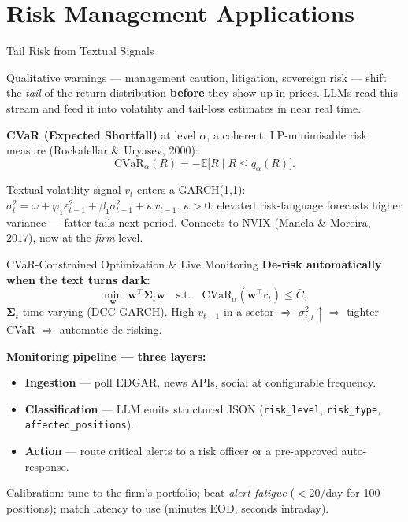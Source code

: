 \documentclass[9pt,t]{beamer}
\begin{document}
\section{Risk Management Applications}

\begin{frame}{Tail Risk from Textual Signals}
\begin{bigpicture}
Qualitative warnings --- management caution, litigation, sovereign risk --- shift the
\emph{tail} of the return distribution \textbf{before} they show up in prices. LLMs read
this stream and feed it into volatility and tail-loss estimates in near real time.
\end{bigpicture}

\textbf{CVaR (Expected Shortfall)} at level $\alpha$, a coherent, LP-minimisable
risk measure (Rockafellar \& Uryasev, 2000):
\[
\text{CVaR}_\alpha(R)=-\mathbb{E}\bigl[R\mid R\le q_\alpha(R)\bigr].
\]

\begin{underhood}
Textual volatility signal $v_t$ enters a GARCH(1,1):\quad
$\sigma_t^2=\omega+\varphi_1\varepsilon_{t-1}^2+\beta_1\sigma_{t-1}^2+\kappa\,v_{t-1}$.
$\kappa>0$: elevated risk-language forecasts higher variance --- fatter tails next period.
Connects to NVIX (Manela \& Moreira, 2017), now at the \emph{firm} level.
\end{underhood}
\end{frame}

\begin{frame}{CVaR-Constrained Optimization \& Live Monitoring}
\textbf{De-risk automatically when the text turns dark:}
\[
\min_{\mathbf{w}}\ \mathbf{w}^\top\boldsymbol{\Sigma}_t\mathbf{w}
\quad\text{s.t.}\quad \text{CVaR}_\alpha(\mathbf{w}^\top\mathbf{r}_t)\le\bar C,
\]
$\boldsymbol{\Sigma}_t$ time-varying (DCC-GARCH). High $v_{t-1}$ in a sector $\Rightarrow$
$\sigma_{i,t}^2\uparrow\Rightarrow$ tighter CVaR $\Rightarrow$ automatic de-risking.

\medskip
\textbf{Monitoring pipeline --- three layers:}
\begin{itemize}
  \item \textbf{Ingestion} --- poll EDGAR, news APIs, social at configurable frequency.
  \item \textbf{Classification} --- LLM emits structured JSON
        (\texttt{risk\_level}, \texttt{risk\_type}, \texttt{affected\_positions}).
  \item \textbf{Action} --- route critical alerts to a risk officer or a pre-approved auto-response.
\end{itemize}

\medskip
\footnotesize Calibration: tune to the firm's portfolio; beat \emph{alert fatigue}
($<20$/day for 100 positions); match latency to use (minutes EOD, seconds intraday).
\end{frame}
\end{document}
